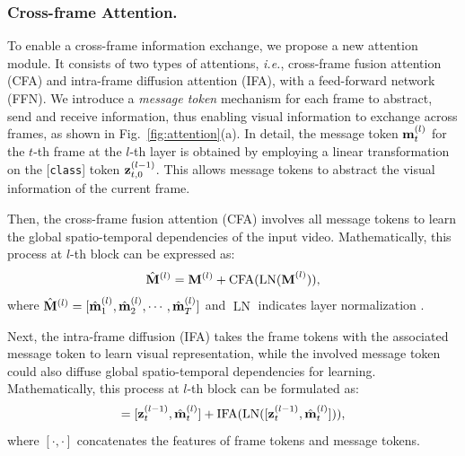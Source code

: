 \documentclass[runningheads]{llncs}
\begin{document}
\vspace{-0.4cm}
\subsubsection{Cross-frame Attention.} 
To enable a cross-frame information exchange, we propose a new attention module. It consists of two types of attentions, \emph{i.e.}, cross-frame fusion attention (CFA) and intra-frame diffusion attention (IFA), with a feed-forward network (FFN). We introduce a \textit{message token} mechanism for each frame to abstract, send and receive information, thus enabling visual information to exchange across frames, as shown in Fig.~\ref{fig:attention}(a). In detail, the message token ${\bf{m}}_t^{(l)}$ for the $t$-th frame at the $l$-th layer is obtained by employing 
a linear transformation on the 
[\texttt{class}] token ${\bf{z}}_{t,0}^{(l-1)}$.
This allows message tokens to abstract the visual information of the current frame.

Then, the cross-frame fusion attention (CFA) involves all message tokens to learn the global spatio-temporal dependencies of the input video.  %
Mathematically, this process at $l$-th block can be expressed as:
\begin{equation}
    \hat{{\bf{M}}}^{(l)} = {\bf{M}}^{(l)} + \operatorname{CFA}({\operatorname{LN}(\bf{M}}^{(l)})),
    \label{equ:8}
\end{equation}
where ${\hat{\bf{M}}}^{(l)}=[\hat{\bf{m}}^{(l)}_1, \hat{\bf{m}}^{(l)}_2, \cdots, \hat{\bf{m}}^{(l)}_T]$ and $\operatorname{LN}$ indicates layer normalization \cite{layernorm}.

Next, the intra-frame diffusion (IFA) takes the frame tokens with the associated message token to learn visual representation, while the involved message token could also diffuse global spatio-temporal dependencies for learning. Mathematically, this process at $l$-th block can be formulated as:
\begin{equation}
    [\hat{{\bf{z}}}^{(l)}_t, \bar{\bf{m}}_t^{(l)}] = [{\bf{z}}^{(l-1)}_t, \hat{{\bf{m}}}_t^{(l)}] + \operatorname{IFA}(\operatorname{LN}([{\bf{z}}^{(l-1)}_t, \hat{{\bf{m}}}_t^{(l)}])),\vspace{-.1cm}
\end{equation}
where $[\cdot,\cdot]$ concatenates the features of frame tokens and message tokens.
\end{document}
